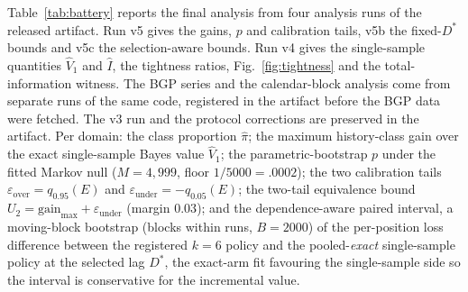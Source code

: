 \documentclass[11pt]{article}
\begin{document}
Table~\ref{tab:battery} reports the final analysis
from four analysis runs of the released artifact. Run v5 gives the gains,
$p$ and calibration tails, v5b the fixed-$D^*$ bounds and v5c the
selection-aware bounds. Run v4 gives the single-sample quantities
$\widehat V_1$ and $\widehat I$, the tightness ratios,
Fig.~\ref{fig:tightness} and the total-information witness. The BGP series and the calendar-block
analysis come from separate runs of the same code, registered in the
artifact before the BGP data were fetched. The v3 run and the
protocol corrections are preserved in the artifact. Per domain: the class proportion $\hat\pi$; the
maximum history-class gain over the exact single-sample Bayes value
$\widehat V_1$; the parametric-bootstrap $p$ under the fitted Markov null
($M{=}4{,}999$, floor $1/5000=.0002$); the two calibration tails
$\varepsilon_{\mathrm{over}}=q_{0.95}(E)$ and
$\varepsilon_{\mathrm{under}}=-q_{0.05}(E)$; the two-tail equivalence
bound $U_2=\text{gain}_{\max}+\varepsilon_{\mathrm{under}}$
(margin $0.03$); and the dependence-aware paired interval, a
moving-block bootstrap (blocks within runs, $B{=}2000$) of the per-position
loss difference between the registered $k{=}6$ policy and the
pooled-\emph{exact} single-sample policy at the selected lag $D^*$, the
exact-arm fit favouring the single-sample side so the interval is
conservative for the incremental value.
\end{document}
